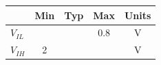 {\setlength{\tabcolsep}{10pt}\begin{tabular}{lcccc}\toprule
 & Min & Typ & Max & Units\\\midrule
$V_{IL}$ & & & 0.8 & V\\
$V_{IH}$ & 2 & & & V\\\bottomrule
\end{tabular}
}

